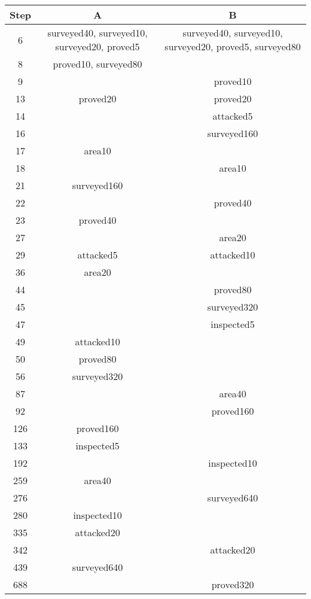 \documentclass{article}
\begin{document}
\begin{tabular}{|c|c|c|}
\hline
Step&A&B\\
\hline
6&surveyed40, surveyed10, surveyed20, proved5&surveyed40, surveyed10, surveyed20, proved5, surveyed80\\
8&proved10, surveyed80&\\
9&&proved10\\
13&proved20&proved20\\
14&&attacked5\\
16&&surveyed160\\
17&area10&\\
18&&area10\\
21&surveyed160&\\
22&&proved40\\
23&proved40&\\
27&&area20\\
29&attacked5&attacked10\\
36&area20&\\
44&&proved80\\
45&&surveyed320\\
47&&inspected5\\
49&attacked10&\\
50&proved80&\\
56&surveyed320&\\
87&&area40\\
92&&proved160\\
126&proved160&\\
133&inspected5&\\
192&&inspected10\\
259&area40&\\
276&&surveyed640\\
280&inspected10&\\
335&attacked20&\\
342&&attacked20\\
439&surveyed640&\\
688&&proved320\\\hline
\end{tabular}
\end{document}
